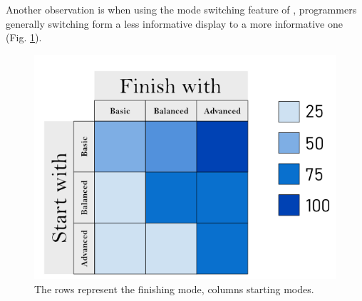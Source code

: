 Another observation is when using the mode switching feature of \chameleon{}, programmers generally switching form a less informative display to a more informative one (Fig. \ref{fig:r4-mode-switching}). 

\begin{figure}[h]
    \centering
    \includegraphics[width=\linewidth]{images/r4-mode-switching.png}
    \caption{
        The rows represent the finishing mode, columns starting modes.
    }
    \label{fig:r4-mode-switching}
\end{figure}


